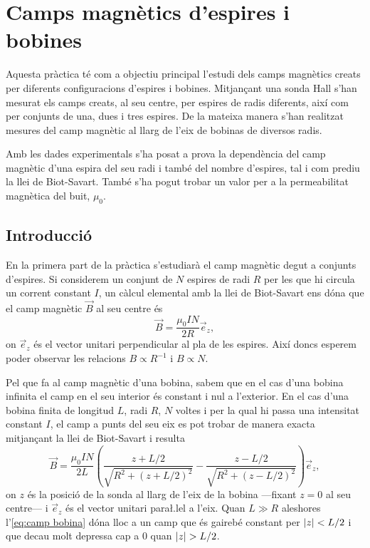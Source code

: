 \chapter{Camps magnètics d'espires i bobines}
\begin{resum}
Aquesta pràctica té com a objectiu principal l'estudi dels camps magnètics creats per diferents configuracions d'espires i bobines. Mitjançant una sonda Hall s'han mesurat els camps creats, al seu centre, per espires de radis diferents, així com per conjunts de una, dues i tres espires. De la mateixa manera s'han realitzat mesures del camp magnètic al llarg de l'eix de bobinas de diversos radis.

Amb les dades experimentals s'ha posat a prova la dependència del camp magnètic d'una espira del seu radi i també del nombre d'espires, tal i com prediu la llei de Biot-Savart. També s'ha pogut trobar un valor per a la permeabilitat magnètica del buit, \( \mu_0 \).
\end{resum}

\section{Introducció}
En la primera part de la pràctica s'estudiarà el camp magnètic degut a conjunts d'espires. Si considerem un conjunt de \( N \) espires de radi \( R \) per les que hi circula un corrent constant \( I \), un càlcul elemental amb la llei de Biot-Savart ens dóna que el camp magnètic \( \vec{B} \) al seu centre és
\begin{equation}\label{eq:camp espira}
  \vec{B}=\frac{\mu_0 I N}{2 R}\vec{e}_z,
\end{equation}
on \( \vec{e}_z \) és el vector unitari perpendicular al pla de les espires. Així doncs esperem poder observar les relacions \( B \propto R^{-1} \) i \( B \propto N \). 

Pel que fa al camp magnètic d'una bobina, sabem que en el cas d'una bobina infinita el camp en el seu interior és constant i nul a l'exterior. En el cas d'una bobina finita de longitud \( L \), radi \( R \), \( N \) voltes i per la qual hi passa una intensitat constant \( I \), el camp a punts del seu eix es pot trobar de manera exacta mitjançant la llei de Biot-Savart i resulta
\begin{equation}\label{eq:camp bobina}
  \vec{B}=\frac{\mu_0 I N}{2 L}\left(\frac{z + L/2}{\sqrt{R^2+(z+L/2)^2}} - \frac{z - L/2}{\sqrt{R^2 + (z - L/2)^2}}\right) \vec{e}_z,
\end{equation}
on \( z \) és la posició de la sonda al llarg de l'eix de la bobina ---fixant \( z = 0 \) al seu centre--- i \( \vec{e}_z \) és el vector unitari para\l.lel a l'eix. Quan \( L \gg R \) aleshores l'\cref{eq:camp bobina} dóna lloc a un camp que és gairebé constant per \( \left\lvert z \right\rvert < L/2 \) i que decau molt depressa cap a 0 quan \( \left\lvert z \right\rvert > L/2 \). 

